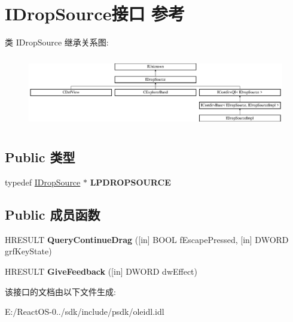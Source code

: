 \hypertarget{interface_i_drop_source}{}\section{I\+Drop\+Source接口 参考}
\label{interface_i_drop_source}
类 I\+Drop\+Source 继承关系图\+:\begin{figure}[H]
\begin{center}
\leavevmode
\includegraphics[height=3.163842cm]{interface_i_drop_source}
\end{center}
\end{figure}
\subsection*{Public 类型}
\begin{DoxyCompactItemize}
\item 
\mbox{\label{interface_i_drop_source_a556a9999d3a4b420090b5ebba3e16924}} 
typedef \hyperlink{interface_i_drop_source}{I\+Drop\+Source} $\ast$ {\bfseries L\+P\+D\+R\+O\+P\+S\+O\+U\+R\+CE}
\end{DoxyCompactItemize}
\subsection*{Public 成员函数}
\begin{DoxyCompactItemize}
\item 
\mbox{\label{interface_i_drop_source_a5bfccff877a5736c6db00ced770fcfb0}} 
H\+R\+E\+S\+U\+LT {\bfseries Query\+Continue\+Drag} (\mbox{[}in\mbox{]} B\+O\+OL f\+Escape\+Pressed, \mbox{[}in\mbox{]} D\+W\+O\+RD grf\+Key\+State)
\item 
\mbox{\label{interface_i_drop_source_a9081e146c335d0c5980d7c439b2999df}} 
H\+R\+E\+S\+U\+LT {\bfseries Give\+Feedback} (\mbox{[}in\mbox{]} D\+W\+O\+RD dw\+Effect)
\end{DoxyCompactItemize}


该接口的文档由以下文件生成\+:\begin{DoxyCompactItemize}
\item 
E\+:/\+React\+O\+S-\/0../sdk/include/psdk/oleidl.\+idl\end{DoxyCompactItemize}
